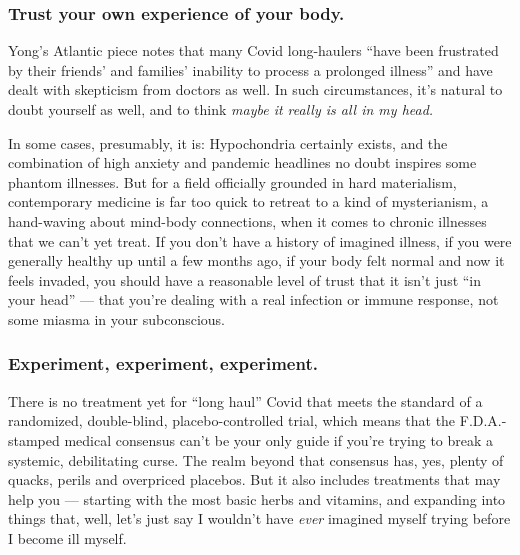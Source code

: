 \hypertarget{trust-your-own-experience-of-your-body}{%
\subsubsection{\texorpdfstring{\textbf{Trust your own experience of your
body.}}{Trust your own experience of your body.}}\label{trust-your-own-experience-of-your-body}}

Yong's Atlantic piece notes that many Covid long-haulers ``have been
frustrated by their friends' and families' inability to process a
prolonged illness'' and have dealt with skepticism from doctors as well.
In such circumstances, it's natural to doubt yourself as well, and to
think \emph{maybe it really is all in my head.}

In some cases, presumably, it is: Hypochondria certainly exists, and the
combination of high anxiety and pandemic headlines no doubt inspires
some phantom illnesses. But for a field officially grounded in hard
materialism, contemporary medicine is far too quick to retreat to a kind
of mysterianism, a hand-waving about mind-body connections, when it
comes to chronic illnesses that we can't yet treat. If you don't have a
history of imagined illness, if you were generally healthy up until a
few months ago, if your body felt normal and now it feels invaded, you
should have a reasonable level of trust that it isn't just ``in your
head'' --- that you're dealing with a real infection or immune response,
not some miasma in your subconscious.

\hypertarget{experiment-experiment-experiment}{%
\subsubsection{\texorpdfstring{\textbf{Experiment, experiment,
experiment.}}{Experiment, experiment, experiment.}}\label{experiment-experiment-experiment}}

There is no treatment yet for ``long haul'' Covid that meets the
standard of a randomized, double-blind, placebo-controlled trial, which
means that the F.D.A.-stamped medical consensus can't be your only guide
if you're trying to break a systemic, debilitating curse. The realm
beyond that consensus has, yes, plenty of quacks, perils and overpriced
placebos. But it also includes treatments that may help you --- starting
with the most basic herbs and vitamins, and expanding into things that,
well, let's just say I wouldn't have \emph{ever} imagined myself trying
before I become ill myself.

